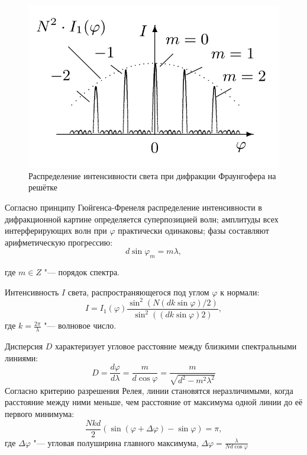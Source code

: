\documentclass[a4paper, 12pt]{article}%
\begin{document}
	\begin{figure}[H]
	\begin{center}
		\includegraphics[width=0.6\linewidth]{1.png}
		\caption{Распределение интенсивности света при дифракции Фраунгофера на решётке}
	\end{center}
\end{figure}
	
	
	
Согласно принципу Гюйгенса-Френеля распределение интенсивности в дифракционной картине определяется суперпозицией волн; амплитуды всех интерферирующих волн при $\varphi$ практически одинаковы; фазы составляют арифметическую прогрессию:
\begin{equation}
	d \sin \varphi_m = m \lambda,
\end{equation}

где $m \in Z$ "--- порядок спектра.
	
	Интенсивность $I$ света, распространяющегося под углом $\varphi$ к нормали:
\begin{equation}
	I = I_1(\varphi)\frac{\sin^2 (N(dk \sin \varphi) / 2)}{\sin^2 ((dk \sin \varphi) 2)},
\end{equation}
	где $k = \frac{2 \pi}{\lambda}$ "--- волновое число.
	
	Дисперсия $D$ характеризует угловое расстояние между близкими спектральными линиями:
\begin{equation}
	D = \frac{d \varphi}{d \lambda} = \frac{m}{d \cos \varphi} = \frac{m}{\sqrt{d^2 - m^2 \lambda^2}}
\end{equation}
	Согласно критерию разрешения Релея, линии становятся неразличимыми, когда расстояние между ними меньше, чем расстояние от максимума одной линии до её первого минимума:
\begin{equation}
	\frac{Nkd}{2}(\sin (\varphi + \Delta \varphi) - \sin \varphi) = \pi,
\end{equation}
	где $\Delta \varphi$ "--- угловая полуширина главного максимума, $\Delta \varphi = \frac{\lambda}{Nd \cos \varphi}$
	
\end{document}
